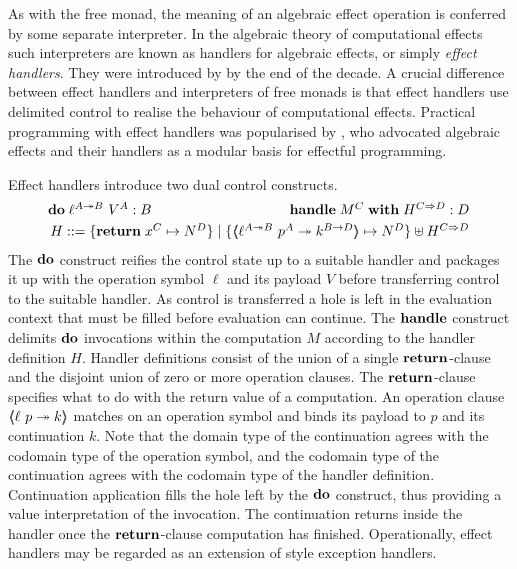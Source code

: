 \documentclass[12pt,phd,lfcs,twoside,openright,logo,leftchapter,normalheadings]{infthesis}
\theoremstyle{plain}
\theoremstyle{definition}
\begin{document}
%
As with the free monad, the meaning of an algebraic effect operation
is conferred by some separate interpreter. In the algebraic theory of
computational effects such interpreters are known as handlers for
algebraic effects, or simply \emph{effect handlers}. They were
introduced by \citet{PlotkinP09,PlotkinP13} by the end of the decade.
%
A crucial difference between effect handlers and interpreters of free
monads is that effect handlers use delimited control to realise the
behaviour of computational effects.
%
Practical programming with effect handlers was popularised by
\citet{KammarLO13}, who advocated algebraic effects and their handlers
as a modular basis for effectful programming.

Effect handlers introduce two dual control constructs.
%
\[
  \ba{@{~}l@{~}r}
    \Do\;\ell^{A \opto B}~V^A : B & \Handle\;M^C\;\With\;H^{C \Harrow D} : D \smallskip\\
    \multicolumn{2}{c}{H ::= \{\Return\;x^C \mapsto N^D\} \mid \{\OpCase{\ell^{A \opto B}}{p^A}{k^{B \to D}} \mapsto N^D\} \uplus H^{C \Harrow D}}
  \ea
\]
%
The $\mathbf{do}$ construct reifies the control state up to a suitable handler
and packages it up with the operation symbol $\ell$ and its payload
$V$ before transferring control to the suitable handler. As control is
transferred a hole is left in the evaluation context that must be
filled before evaluation can continue. The $\mathbf{handle}$ construct
delimits $\mathbf{do}$ invocations within the computation $M$ according to the
handler definition $H$. Handler definitions consist of the union of a
single $\mathbf{return}$-clause and the disjoint union of zero or more
operation clauses. The $\mathbf{return}$-clause specifies what to do with the
return value of a computation. An operation clause
$\langle\!\!\langle \ell~p \twoheadrightarrow k \rangle\!\!\rangle$ matches on an operation symbol and binds its
payload to $p$ and its continuation $k$. Note that the domain type of
the continuation agrees with the codomain type of the operation
symbol, and the codomain type of the continuation agrees with the
codomain type of the handler definition. Continuation application
fills the hole left by the $\mathbf{do}$ construct, thus providing a value
interpretation of the invocation. The continuation returns inside the
handler once the $\mathbf{return}$-clause computation has finished.
%
Operationally, effect handlers may be regarded as an extension of
\citet{BentonK01} style exception handlers.
\end{document}
